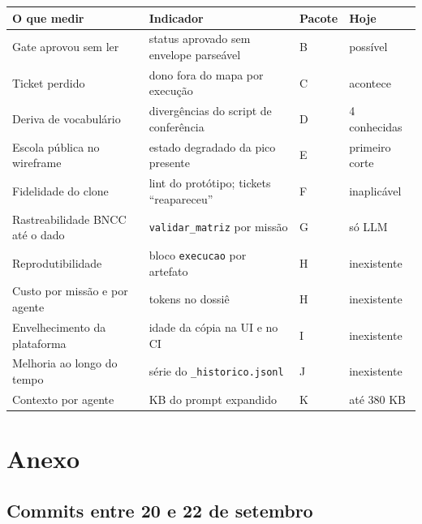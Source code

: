 \documentclass[11pt,a4paper]{article}
\begin{document}
\begin{center}\small
\begin{tabular}{@{}p{4.6cm} p{5.8cm} p{1.6cm} p{3.2cm}@{}}
\toprule
\textbf{O que medir} & \textbf{Indicador} & \textbf{Pacote} & \textbf{Hoje} \\
\midrule
Gate aprovou sem ler & status aprovado sem envelope parseável & B & possível \\
Ticket perdido & dono fora do mapa por execução & C & acontece \\
Deriva de vocabulário & divergências do script de conferência & D & 4 conhecidas \\
Escola pública no wireframe & estado degradado da pico presente & E & primeiro corte \\
Fidelidade do clone & lint do protótipo; tickets ``reapareceu'' & F & inaplicável \\
Rastreabilidade BNCC até o dado & \texttt{validar\_matriz} por missão & G & só LLM \\
Reprodutibilidade & bloco \texttt{execucao} por artefato & H & inexistente \\
Custo por missão e por agente & tokens no dossiê & H & inexistente \\
Envelhecimento da plataforma & idade da cópia na UI e no CI & I & inexistente \\
Melhoria ao longo do tempo & série do \texttt{\_historico.jsonl} & J & inexistente \\
Contexto por agente & KB do prompt expandido & K & até 380 KB \\
\bottomrule
\end{tabular}
\end{center}

\section{Anexo}

\subsection{Commits entre 20 e 22 de setembro}
\end{document}
